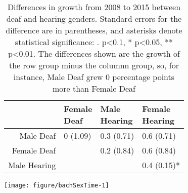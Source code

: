 \documentclass{article}\usepackage[]{graphicx}\usepackage[]{color}
\makeatletter
\def\maxwidth{ %
  \ifdim\Gin@nat@width>\linewidth
    \linewidth
  \else
    \Gin@nat@width
  \fi
}
\newenvironment{knitrout}{}{} %
\makeatother
\begin{document}
\begin{table}[ht]
\centering
\begin{tabular}{rlll}
  \hline
 & \thead{Female\\Deaf} & \thead{Male\\Hearing} & \thead{Female\\Hearing} \\
  \hline
Male Deaf & 0 (1.09) & 0.3 (0.71) & 0.6 (0.71) \\
  Female Deaf &  & 0.2 (0.84) & 0.6 (0.84) \\
  Male Hearing &  &  & 0.4 (0.15)* \\
   \hline
\end{tabular}
\caption{Differences in growth from 2008 to 2015 between deaf and hearing genders. Standard errors for the difference are in parentheses, and asterisks denote statistical significance: . p<0.1, * p<0.05, ** p<0.01. The differences shown are the growth of the row group minus the columnn group, so, for instance, Male Deaf grew 0 percentage points more than Female Deaf}
\label{tab:hsSexGrowth}
\end{table}



\begin{center}
\begin{knitrout}
\color{fgcolor}
\texttt{[image: figure/bachSexTime-1]}

\end{knitrout}
\end{center}
\end{document}
